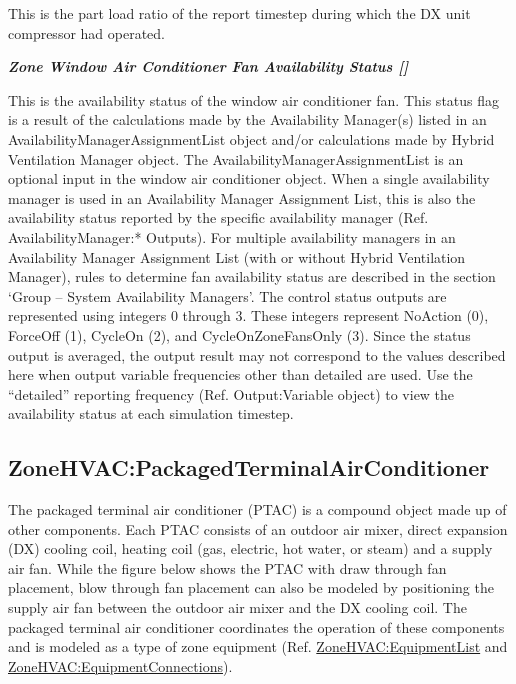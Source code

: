 This is the part load ratio of the report timestep during which the DX unit compressor had operated.

\textbf{\emph{Zone Window Air Conditioner Fan Availability Status {[]}}}

This is the availability status of the window air conditioner fan. This status flag is a result of the calculations made by the Availability Manager(s) listed in an AvailabilityManagerAssignmentList object and/or calculations made by Hybrid Ventilation Manager object. The AvailabilityManagerAssignmentList is an optional input in the window air conditioner object. When a single availability manager is used in an Availability Manager Assignment List, this is also the availability status reported by the specific availability manager (Ref. AvailabilityManager:* Outputs). For multiple availability managers in an Availability Manager Assignment List (with or without Hybrid Ventilation Manager), rules to determine fan availability status are described in the section `Group -- System Availability Managers'. The control status outputs are represented using integers 0 through 3. These integers represent NoAction (0), ForceOff (1), CycleOn (2), and CycleOnZoneFansOnly (3). Since the status output is averaged, the output result may not correspond to the values described here when output variable frequencies other than detailed are used. Use the ``detailed'' reporting frequency (Ref. Output:Variable object) to view the availability status at each simulation timestep.

\subsection{ZoneHVAC:PackagedTerminalAirConditioner}\label{zonehvacpackagedterminalairconditioner}

The packaged terminal air conditioner (PTAC) is a compound object made up of other components. Each PTAC consists of an outdoor air mixer, direct expansion (DX) cooling coil, heating coil (gas, electric, hot water, or steam) and a supply air fan. While the figure below shows the PTAC with draw through fan placement, blow through fan placement can also be modeled by positioning the supply air fan between the outdoor air mixer and the DX cooling coil. The packaged terminal air conditioner coordinates the operation of these components and is modeled as a type of zone equipment (Ref. \hyperref[zonehvacequipmentlist]{ZoneHVAC:EquipmentList} and \hyperref[zonehvacequipmentconnections]{ZoneHVAC:EquipmentConnections}).

